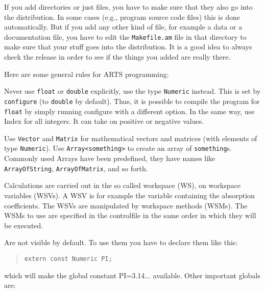 
If you add directories or just files, you have to make sure that they
also go into the distribution. In some cases (e.g., program source
code files) this is done automatically. But if you add any other kind
of file, for example a data or a documentation file, you have to edit
the \verb|Makefile.am| file in that directory to make sure that your
stuff goes into the distribution. It is a good idea to always check
the release in order to see if the things you added are really there.

\label{sec:development:conv}

Here are some general rules for ARTS programming:

\levelc{} Never use \verb|float| or \verb|double| explicitly, use the
type \verb|Numeric| instead.  This is set by \verb|configure| (to
\verb|double| by default). Thus, it is possible to compile the program
for \verb|float| by simply running configure with a different option.
%
%
In the same way, use Index for all integers. It can take on positive
or negative values.

\levelc{} Use \verb|Vector| and \verb|Matrix| for mathematical vectors
and matrices (with elements of type \verb|Numeric|). Use
\verb|Array<something>| to create an array of \verb|something|s. Commonly
used Arrays have been predefined, they have names like
\verb|ArrayOfString|, \verb|ArrayOfMatrix|, and so forth.

Calculations are carried out in the so called workspace (WS), on
workspace variables (WSVs). A WSV is for example the variable
containing the absorption coefficients. The WSVs are manipulated by 
workspace methods (WSMs). The WSMs to use are specified in the
controlfile in the same order in which they will be
executed. 

   Are not visible by default. To use them you have to declare them
   like this:
   \begin{quote}
   \verb|extern const Numeric PI;|
   \end{quote}
   which will make the global constant PI=3.14... available. Other important globals are:

